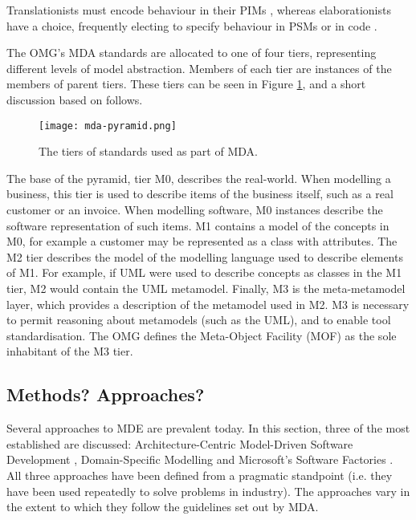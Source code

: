 Translationists must encode behaviour in their PIMs \cite{mellor02executable}, whereas elaborationists have a choice, frequently electing to specify behaviour in PSMs or in code \cite{kleppe03mda}.

The OMG's MDA standards are allocated to one of four tiers, representing different levels of model abstraction. Members of each tier are instances of the members of parent tiers. These tiers can be seen in Figure \ref{fig:mda-pyramid}, and a short discussion based on \cite[Section 8.2]{kleppe03mda} follows.

\begin{figure}[htbp]
  \begin{center}
    \leavevmode
    \texttt{[image: mda-pyramid.png]}
  \end{center}
  \caption{The tiers of standards used as part of MDA.}
  \label{fig:mda-pyramid}
\end{figure}

The base of the pyramid, tier M0, describes the real-world. When modelling a business, this tier is used to describe items of the business itself, such as a real customer or an invoice. When modelling software, M0 instances
describe the software representation of such items. M1 contains a model of the concepts in M0, for example a customer may be represented as a class with attributes. The M2 tier describes the model of the modelling language used to describe elements of M1. For example, if UML \cite{uml212} were used to describe concepts as classes in the M1 tier, M2 would contain the UML metamodel. Finally, M3 is the meta-metamodel layer, which provides a description of the metamodel used in M2. M3 is necessary to permit reasoning about metamodels (such as the UML), and to enable tool standardisation. The OMG defines the Meta-Object Facility (MOF) \cite{mof} as the sole inhabitant of the M3 tier.



\subsection{Methods? Approaches?}

Several approaches to MDE are prevalent today. In this section,  three of the most established are discussed: Architecture-Centric Model-Driven Software Development \cite{stahl06mdsd}, Domain-Specific Modelling \cite{kelly08dsm} and Microsoft's Software Factories \cite{greenfield04software}. All three approaches have been defined from a pragmatic standpoint (i.e. they have been used repeatedly to solve problems in industry). The approaches vary in the extent to which they follow the guidelines set out by MDA.


